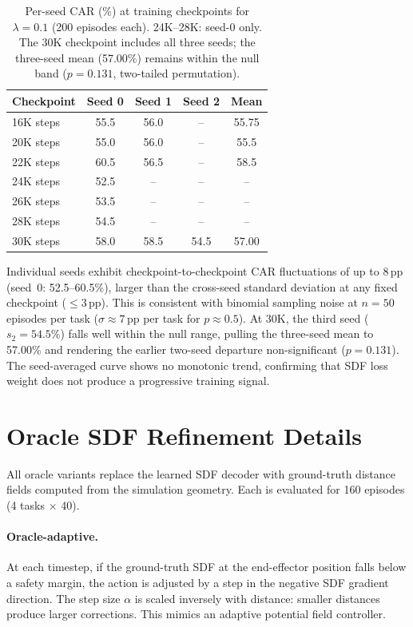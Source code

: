 \begin{table}[h]
\centering
\caption{Per-seed CAR (\%) at training checkpoints for $\lambda = 0.1$ (200 episodes each). 24K--28K: seed-0 only. The 30K checkpoint includes all three seeds; the three-seed mean (57.00\%) remains within the null band ($p = 0.131$, two-tailed permutation).}
\label{tab:stepwise_lambda01}
\vspace{2pt}
\small
\begin{tabular}{lcccc}
\toprule
Checkpoint & Seed 0 & Seed 1 & Seed 2 & Mean \\
\midrule
16K steps & 55.5 & 56.0 & -- & 55.75 \\
20K steps & 55.0 & 56.0 & -- & 55.5 \\
22K steps & 60.5 & 56.5 & -- & 58.5 \\
24K steps & 52.5 & -- & -- & -- \\
26K steps & 53.5 & -- & -- & -- \\
28K steps & 54.5 & -- & -- & -- \\
30K steps & 58.0 & 58.5 & 54.5 & 57.00 \\
\bottomrule
\end{tabular}
\end{table}

Individual seeds exhibit checkpoint-to-checkpoint CAR fluctuations of up to 8\,pp (seed~0: 52.5--60.5\%), larger than the cross-seed standard deviation at any fixed checkpoint ($\leq$3\,pp). This is consistent with binomial sampling noise at $n = 50$ episodes per task ($\sigma \approx 7$\,pp per task for $p \approx 0.5$). At 30K, the third seed ($s_2 = 54.5\%$) falls well within the null range, pulling the three-seed mean to 57.00\% and rendering the earlier two-seed departure non-significant ($p = 0.131$). The seed-averaged curve shows no monotonic trend, confirming that SDF loss weight does not produce a progressive training signal.


\section{Oracle SDF Refinement Details}
\label{sec:appendix_oracle}

All oracle variants replace the learned SDF decoder with ground-truth distance fields computed from the simulation geometry. Each is evaluated for 160 episodes (4 tasks $\times$ 40).

\paragraph{Oracle-adaptive.} At each timestep, if the ground-truth SDF at the end-effector position falls below a safety margin, the action is adjusted by a step in the negative SDF gradient direction. The step size $\alpha$ is scaled inversely with distance: smaller distances produce larger corrections. This mimics an adaptive potential field controller.

